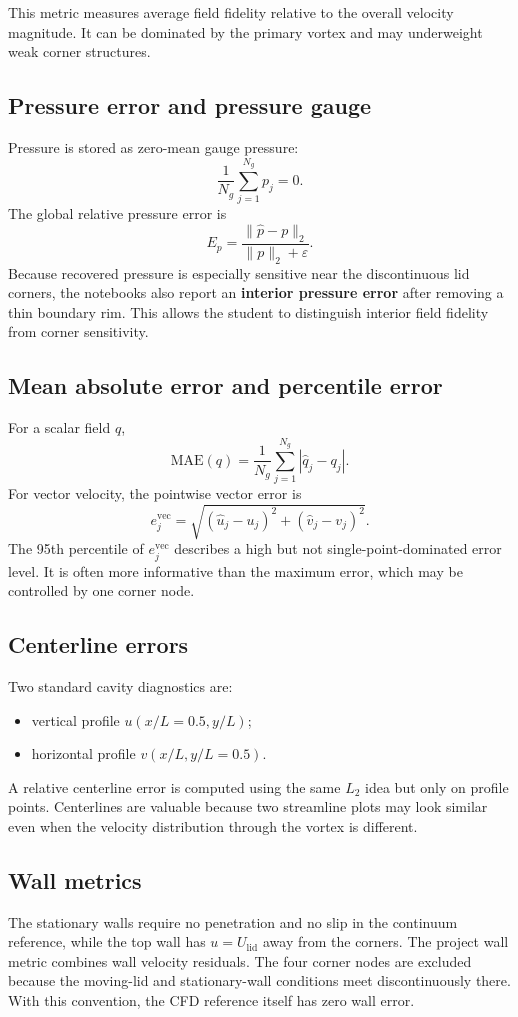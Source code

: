 \documentclass[11pt]{article}
\begin{document}
This metric measures average field fidelity relative to the overall velocity magnitude. It can be dominated by the primary vortex and may underweight weak corner structures.

\subsection{Pressure error and pressure gauge}
Pressure is stored as zero-mean gauge pressure:
\[
\frac{1}{N_g}\sum_{j=1}^{N_g}p_j=0.
\]
The global relative pressure error is
\[
E_p=\frac{\|\hat p-p\|_2}{\|p\|_2+\varepsilon}.
\]
Because recovered pressure is especially sensitive near the discontinuous lid corners, the notebooks also report an \textbf{interior pressure error} after removing a thin boundary rim. This allows the student to distinguish interior field fidelity from corner sensitivity.

\subsection{Mean absolute error and percentile error}
For a scalar field $q$,
\[
\mathrm{MAE}(q)=\frac{1}{N_g}\sum_{j=1}^{N_g}|\hat q_j-q_j|.
\]
For vector velocity, the pointwise vector error is
\[
e_j^{\mathrm{vec}}=
\sqrt{(\hat u_j-u_j)^2+(\hat v_j-v_j)^2}.
\]
The 95th percentile of $e_j^{\mathrm{vec}}$ describes a high but not single-point-dominated error level. It is often more informative than the maximum error, which may be controlled by one corner node.

\subsection{Centerline errors}
Two standard cavity diagnostics are:
\begin{itemize}
\item vertical profile $u(x/L=0.5,y/L)$;
\item horizontal profile $v(x/L,y/L=0.5)$.
\end{itemize}
A relative centerline error is computed using the same $L_2$ idea but only on profile points. Centerlines are valuable because two streamline plots may look similar even when the velocity distribution through the vortex is different.

\subsection{Wall metrics}
The stationary walls require no penetration and no slip in the continuum reference, while the top wall has $u=U_{\mathrm{lid}}$ away from the corners. The project wall metric combines wall velocity residuals. The four corner nodes are excluded because the moving-lid and stationary-wall conditions meet discontinuously there. With this convention, the CFD reference itself has zero wall error.
\end{document}
